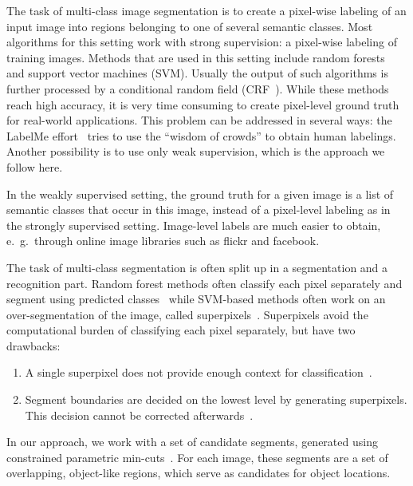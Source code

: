 The task of multi-class image segmentation is to create a pixel-wise labeling of an input image
into regions belonging to one of several semantic classes.
Most algorithms for this setting work with strong supervision: a pixel-wise labeling
of training images. Methods that are used in this setting include random forests~\citep{schroff2008object} and support vector machines (SVM). Usually
the output of such algorithms is further processed by a conditional random field (CRF~\citep{ladicky2009associative,gonfaus2010harmony,jiang2009efficient}).
While these methods reach high accuracy, it is very time consuming to create
pixel-level ground truth for real-world applications.
This problem can be addressed in several ways:
the LabelMe effort~\citep{russell2008labelme} tries to use the ``wisdom of crowds'' to obtain human labelings.
Another possibility is to use only weak supervision, which is the approach we follow here.

In the weakly supervised setting, the ground
 truth for a given image is a list of semantic classes that occur in this image, instead of a pixel-level
labeling as in the strongly supervised setting.
Image-level labels are much easier to obtain, e.~g.\  through online image libraries such as flickr and facebook.

The task of multi-class segmentation is often split up in a segmentation
and a recognition part. Random forest methods often classify each pixel
separately and segment using predicted classes~\citep{schroff2008object} while SVM-based methods often work on an
over-segmentation of the image, called superpixels~\citep{ladicky2009associative,gonfaus2010harmony}. Superpixels avoid the
computational burden of classifying each pixel separately, but have
two drawbacks:
\begin{enumerate}
    \item A single superpixel does not provide enough context for classification~\citep{fulkerson2009class}.
    \item Segment boundaries are decided on the lowest level by generating
        superpixels. This decision cannot be corrected afterwards~\citep{hanbury2008superpixels}.
\end{enumerate}
In our approach, we work with a set of candidate segments, generated using constrained parametric min-cuts~\citep{carreira2010constrained}.
For each image, these segments are a set of overlapping, object-like regions, which serve
as candidates for object locations.

